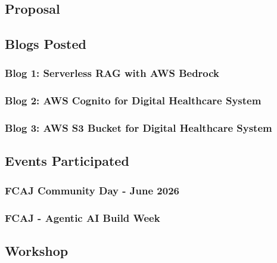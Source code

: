 \newpage

\subsection{Proposal}



\newpage

\subsection{Blogs Posted}

\subsubsection{Blog 1: Serverless RAG with AWS Bedrock}


\subsubsection{Blog 2: AWS Cognito for Digital Healthcare System}


\subsubsection{Blog 3: AWS S3 Bucket for Digital Healthcare System}


\newpage

\subsection{Events Participated}

\subsubsection{FCAJ Community Day - June 2026}


\subsubsection{FCAJ - Agentic AI Build Week}


\newpage

\subsection{Workshop}

